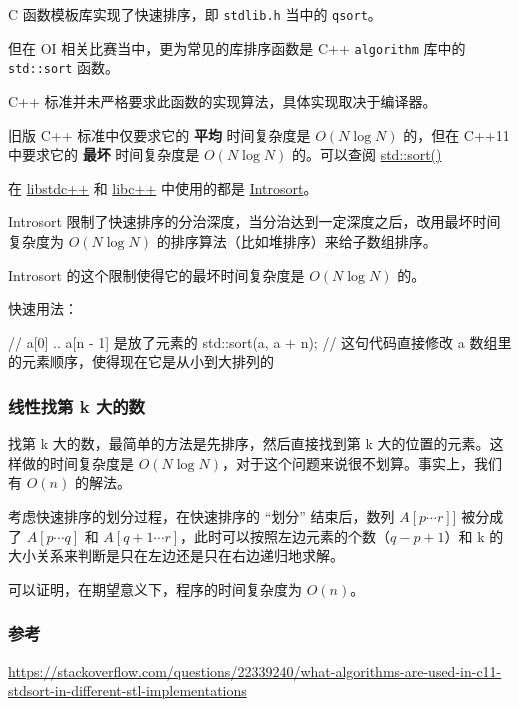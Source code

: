C 函数模板库实现了快速排序，即 \texttt{stdlib.h} 当中的 \texttt{qsort}。

但在 OI 相关比赛当中，更为常见的库排序函数是 C++ \texttt{algorithm} 库中的 \texttt{std::sort} 函数。

C++ 标准并未严格要求此函数的实现算法，具体实现取决于编译器。

旧版 C++ 标准中仅要求它的 \textbf{平均} 时间复杂度是 $O(N\log N)$ 的，但在 C++11 中要求它的 \textbf{最坏} 时间复杂度是 $O(N\log N)$ 的。可以查阅 \href{https://en.cppreference.com/w/cpp/algorithm/sort}{std::sort()}

在 \href{https://github.com/mirrors/gcc/blob/master/libstdc++-v3/include/bits/stl_algo.h}{libstdc++} 和 \href{http://llvm.org/svn/llvm-project/libcxx/trunk/include/algorithm}{libc++} 中使用的都是 \href{https://en.wikipedia.org/wiki/Introsort}{Introsort}。

Introsort 限制了快速排序的分治深度，当分治达到一定深度之后，改用最坏时间复杂度为 $O(N\log N)$ 的排序算法（比如堆排序）来给子数组排序。

Introsort 的这个限制使得它的最坏时间复杂度是 $O(N\log N)$ 的。

快速用法：

\begin{cppcode}
// a[0] .. a[n - 1] 是放了元素的
std::sort(a, a + n);
// 这句代码直接修改 a 数组里的元素顺序，使得现在它是从小到大排列的
\end{cppcode}

\subsubsection{线性找第 k 大的数}

找第 k 大的数，最简单的方法是先排序，然后直接找到第 k 大的位置的元素。这样做的时间复杂度是 $O(N\log N)$，对于这个问题来说很不划算。事实上，我们有 $O(n)$ 的解法。

考虑快速排序的划分过程，在快速排序的 “划分” 结束后，数列 $A[p \cdots r]]$ 被分成了 $A[p \cdots q]$ 和 $A[q+1 \cdots r]$，此时可以按照左边元素的个数（$q - p + 1$）和 k 的大小关系来判断是只在左边还是只在右边递归地求解。

可以证明，在期望意义下，程序的时间复杂度为 $O(n)$。

\subsubsection{参考}

\url{https://stackoverflow.com/questions/22339240/what-algorithms-are-used-in-c11-stdsort-in-different-stl-implementations}

